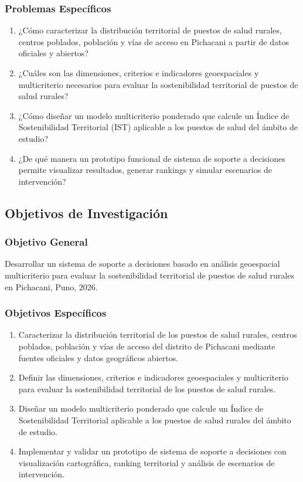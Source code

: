 \documentclass[12pt,a4paper,oneside]{article}
\begin{document}
\subsubsection{Problemas Específicos}
\begin{enumerate}[label={PE\arabic*:}]
    \item ¿Cómo caracterizar la distribución territorial de puestos de salud rurales, centros poblados, población y vías de acceso en Pichacani a partir de datos oficiales y abiertos?
    \item ¿Cuáles son las dimensiones, criterios e indicadores geoespaciales y multicriterio necesarios para evaluar la sostenibilidad territorial de puestos de salud rurales?
    \item ¿Cómo diseñar un modelo multicriterio ponderado que calcule un Índice de Sostenibilidad Territorial (IST) aplicable a los puestos de salud del ámbito de estudio?
    \item ¿De qué manera un prototipo funcional de sistema de soporte a decisiones permite visualizar resultados, generar rankings y simular escenarios de intervención?
\end{enumerate}

\subsection{Objetivos de Investigación}
\subsubsection{Objetivo General}
Desarrollar un sistema de soporte a decisiones basado en análisis geoespacial multicriterio para evaluar la sostenibilidad territorial de puestos de salud rurales en Pichacani, Puno, 2026.

\subsubsection{Objetivos Específicos}
\begin{enumerate}[label={OE\arabic*:}]
    \item Caracterizar la distribución territorial de los puestos de salud rurales, centros poblados, población y vías de acceso del distrito de Pichacani mediante fuentes oficiales y datos geográficos abiertos.
    \item Definir las dimensiones, criterios e indicadores geoespaciales y multicriterio para evaluar la sostenibilidad territorial de los puestos de salud rurales.
    \item Diseñar un modelo multicriterio ponderado que calcule un Índice de Sostenibilidad Territorial aplicable a los puestos de salud rurales del ámbito de estudio.
    \item Implementar y validar un prototipo de sistema de soporte a decisiones con visualización cartográfica, ranking territorial y análisis de escenarios de intervención.
\end{enumerate}
\end{document}
